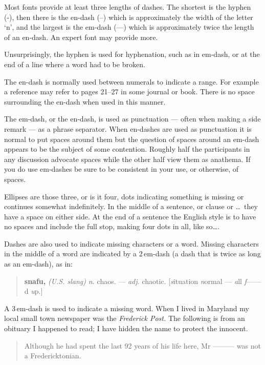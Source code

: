 \documentclass[10pt,a4paper,oneside,extrafontsizes]{memoir}%
\newcommand\U[2]{\textrm{#1}\,\textrm{#2}}
\begin{document}
\begin{paracol}{2}
\switchEng
    Most fonts provide at least three lengths of dashes. The shortest is
the hyphen (-), then there is the en-dash (--) which is approximately the
width of the letter `n', and the largest is the em-dash (---) which is
approximately twice the length of an en-dash. An expert font may provide
more.

   Unsurprisingly, the hyphen 
is used for hyphenation, such as in em-dash, or
at the end of a line where a word had to be broken.

    The en-dash 
is normally used between numerals to indicate a range. For
example a reference may refer to pages 21--27 in some journal or book. There
is no space surrounding the en-dash when used in this manner.

    The em-dash, 
or the en-dash, is used as punctuation --- often when making a side 
remark --- as a phrase separator.
 When en-dashes are used as punctuation it is normal to put spaces around them
but the question of spaces around an em-dash appears to be the subject of
some contention. Roughly half the participants in any discussion advocate
spaces while the other half view them as anathema. If you do use em-dashes
be sure to be consistent in your use, or otherwise, of spaces.

    Ellipses are those three, or is it four, 
dots indicating something is
missing or continues somewhat indefinitely. In the middle of a sentence,
or clause or \ldots\ they have a space on either side. At the end of
a sentence the English style is to have no spaces and include the full
stop, making four dots in all, like so\ldots.

   Dashes are also used to indicate missing characters or a word. Missing
characters in the middle of a word are indicated by a 
\U{2}{em}-dash\index{dash!2em@\U{2}{em}}\index{2em-dash@\U{2}{em}-dash} (a dash that
is twice as long as an em-dash), as in:
\begin{quote}
\textbf{snafu,} \textit{(U.S. slang)} \textit{n.} chaos. --- \textit{adj.}
  chaotic. [\textit{s}ituation \textit{n}ormal --- \textit{a}ll
  \textit{f}------d \textit{u}p.]
\end{quote}
A \U{3}{em}-dash\index{dash!1em@\U{3}{em}}\index{3em-dash@\U{3}{em}-dash} is used to indicate a 
missing word. When I lived in Maryland my
local small town newspaper was the \textit{Frederick Post.} 
The following is from an 
obituary I happened to read; I have hidden the name to protect the 
innocent.
\begin{quote}
  Although he had spent the last 92 years of his life here, 
Mr --------- was not a Fredericktonian.
\end{quote}
\end{paracol}
\end{document}
